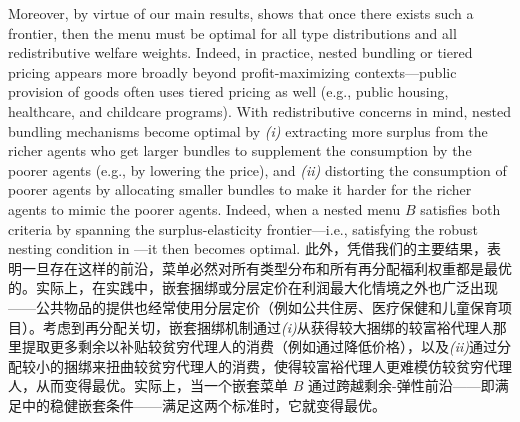 \documentclass[12pt,letterpaper]{article}
\newenvironment{original}{\color{black}\noindent}{}
\newenvironment{translation}{\color{blue}\noindent}{}
\theoremstyle{plain}
\theoremstyle{definition}
\theoremstyle{remark}
\renewcommand{\1}{\mathds{1}}
\theoremstyle{definition}
\begin{document}
\begin{original}
Moreover, by virtue of our main results,  shows that once there exists such a frontier, then the menu must be optimal for all type distributions and all redistributive welfare weights. Indeed, in practice, nested bundling or tiered pricing appears more broadly beyond profit-maximizing contexts---public provision of goods often uses tiered pricing  as well (e.g., public housing, healthcare, and childcare programs). With redistributive concerns in mind, nested bundling mechanisms become optimal by \textit{(i)} extracting more surplus from the richer agents who get larger bundles to supplement the consumption by the poorer agents (e.g., by lowering the price), and \textit{(ii)} distorting the consumption of poorer agents by allocating smaller bundles to make it harder for the richer agents to mimic the poorer agents. Indeed, when a nested menu $B$ satisfies both criteria by spanning the surplus-elasticity frontier---i.e., satisfying the robust nesting condition in ---it then becomes optimal.
\end{original}
\begin{translation}
此外，凭借我们的主要结果，表明一旦存在这样的前沿，菜单必然对所有类型分布和所有再分配福利权重都是最优的。实际上，在实践中，嵌套捆绑或分层定价在利润最大化情境之外也广泛出现——公共物品的提供也经常使用分层定价（例如公共住房、医疗保健和儿童保育项目）。考虑到再分配关切，嵌套捆绑机制通过\textit{(i)}从获得较大捆绑的较富裕代理人那里提取更多剩余以补贴较贫穷代理人的消费（例如通过降低价格），以及\textit{(ii)}通过分配较小的捆绑来扭曲较贫穷代理人的消费，使得较富裕代理人更难模仿较贫穷代理人，从而变得最优。实际上，当一个嵌套菜单 $B$ 通过跨越剩余-弹性前沿——即满足中的稳健嵌套条件——满足这两个标准时，它就变得最优。
\end{translation}
\end{document}
